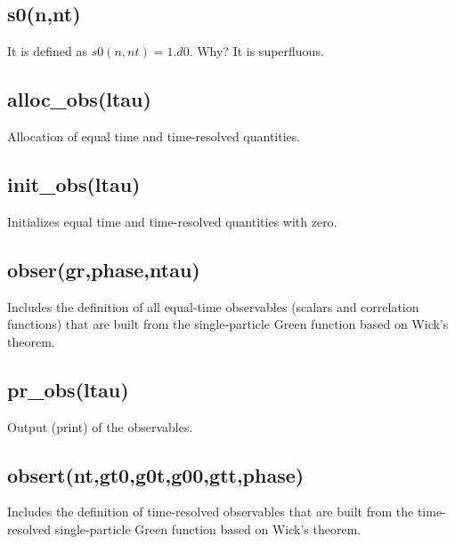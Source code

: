 \subsection{s0(n,nt)}
It is defined as $s0(n,nt)=1.d0$. Why? It is superfluous.

\subsection{alloc\_obs(ltau)}
Allocation of equal time and time-resolved quantities.

\subsection{init\_obs(ltau)}
Initializes equal time and time-resolved quantities with zero.

\subsection{obser(gr,phase,ntau)}
Includes the definition of all equal-time observables (scalars and correlation functions) that are built from the single-particle Green function based on 
Wick's theorem.

\subsection{pr\_obs(ltau)}
Output (print) of the observables.

\subsection{obsert(nt,gt0,g0t,g00,gtt,phase)}
Includes the definition of time-resolved observables that are built from the time-resolved single-particle Green function based on 
Wick's theorem.